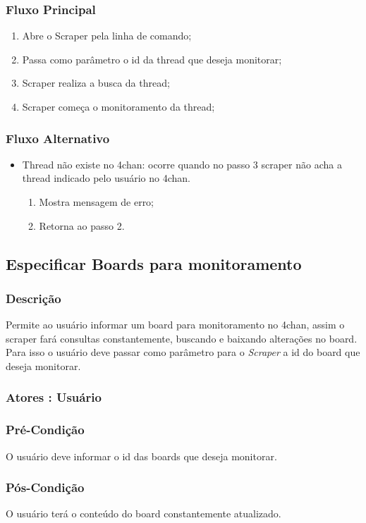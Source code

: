 \subsubsection{Fluxo Principal}
\begin{enumerate}
    \item Abre o Scraper pela linha de comando;
    \item Passa como parâmetro o id da thread que deseja monitorar;
    \item Scraper realiza a busca da thread;
    \item Scraper começa o monitoramento da thread;
\end{enumerate}
\subsubsection{Fluxo Alternativo}
\begin{itemize}
    \item Thread não existe no 4chan: ocorre quando no passo 3 scraper não acha a thread indicado pelo usuário no 4chan.
    \begin{enumerate}
        \item Mostra mensagem de erro;
        \item Retorna ao passo 2.
    \end{enumerate}
\end{itemize}


\subsection{Especificar Boards para monitoramento}
\subsubsection{Descrição}
Permite ao usuário informar um board para monitoramento no 4chan, assim o scraper fará consultas constantemente, buscando e baixando alterações no board. Para isso o usuário deve passar como parâmetro para o \textit{Scraper} a id do board que deseja monitorar.  
\subsubsection{Atores : Usuário}
\subsubsection{Pré-Condição}
O usuário deve informar o id das boards que deseja monitorar.
\subsubsection{Pós-Condição}
O usuário terá o conteúdo do board constantemente atualizado.
